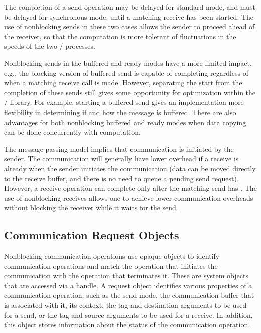 \begin{users}
The completion of a send operation may be delayed for standard mode, and must
be delayed for synchronous mode, until a matching receive has been started.
The use of nonblocking sends in these two cases allows the sender to proceed
ahead of the receiver, so that the computation is more tolerant
of fluctuations in the speeds of the two \MPI/ processes.

Nonblocking sends in the buffered and ready modes have a more limited
impact, e.g., the blocking version of buffered send is capable of
completing regardless of when a matching receive call is made. However,
separating the start from the completion of these sends still gives
some opportunity for optimization within the \MPI/ library. For example,
starting a buffered send gives an implementation more flexibility in
determining if and how the message is buffered. There are also advantages
for both nonblocking buffered and ready modes when data copying can
be done concurrently with computation.

The message-passing model implies that communication is initiated by
the sender.
The communication will generally have lower overhead if a receive is
already  when the sender initiates the communication (data can be moved
directly to the receive buffer, and there is no need to queue a pending send
request).  However,
a receive operation can complete only after the matching send has .
The use of nonblocking receives allows one to achieve lower communication overheads
without blocking the receiver while it waits for the send.
\end{users}

\subsection{Communication Request Objects}
\label{subsec:pt2pt-commobject}

Nonblocking communication operations use opaque  objects to
identify communication operations and match the operation that
initiates the communication with the operation that terminates it.
These are system objects that are accessed via a handle.
A request object identifies various properties of a communication
operation, such as the send mode, the communication
buffer that is associated with it, its
context, the tag and destination arguments to be used for a send, or the tag
and source arguments to be used for a receive.  In addition, this object stores
information about the status of the  communication operation.

